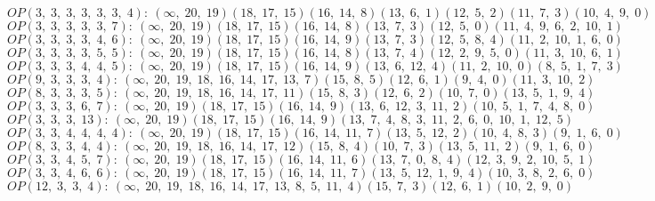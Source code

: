 $OP(3, \;3, \;3, \;3, \;3, \;3, \;4): \:(\infty, \;20, \;19)(18, \;17, \;15)(16, \;14, \;8)(13, \;6, \;1)(12, \;5, \;2)(11, \;7, \;3)(10, \;4, \;9, \;0)$\\
$OP(3, \;3, \;3, \;3, \;3, \;7): \:(\infty, \;20, \;19)(18, \;17, \;15)(16, \;14, \;8)(13, \;7, \;3)(12, \;5, \;0)(11, \;4, \;9, \;6, \;2, \;10, \;1)$\\
$OP(3, \;3, \;3, \;3, \;4, \;6): \:(\infty, \;20, \;19)(18, \;17, \;15)(16, \;14, \;9)(13, \;7, \;3)(12, \;5, \;8, \;4)(11, \;2, \;10, \;1, \;6, \;0)$\\
$OP(3, \;3, \;3, \;3, \;5, \;5): \:(\infty, \;20, \;19)(18, \;17, \;15)(16, \;14, \;8)(13, \;7, \;4)(12, \;2, \;9, \;5, \;0)(11, \;3, \;10, \;6, \;1)$\\
$OP(3, \;3, \;3, \;4, \;4, \;5): \:(\infty, \;20, \;19)(18, \;17, \;15)(16, \;14, \;9)(13, \;6, \;12, \;4)(11, \;2, \;10, \;0)(8, \;5, \;1, \;7, \;3)$\\
$OP(9, \;3, \;3, \;3, \;4): \:(\infty, \;20, \;19, \;18, \;16, \;14, \;17, \;13, \;7)(15, \;8, \;5)(12, \;6, \;1)(9, \;4, \;0)(11, \;3, \;10, \;2)$\\
$OP(8, \;3, \;3, \;3, \;5): \:(\infty, \;20, \;19, \;18, \;16, \;14, \;17, \;11)(15, \;8, \;3)(12, \;6, \;2)(10, \;7, \;0)(13, \;5, \;1, \;9, \;4)$\\
$OP(3, \;3, \;3, \;6, \;7): \:(\infty, \;20, \;19)(18, \;17, \;15)(16, \;14, \;9)(13, \;6, \;12, \;3, \;11, \;2)(10, \;5, \;1, \;7, \;4, \;8, \;0)$\\
$OP(3, \;3, \;3, \;13): \:(\infty, \;20, \;19)(18, \;17, \;15)(16, \;14, \;9)(13, \;7, \;4, \;8, \;3, \;11, \;2, \;6, \;0, \;10, \;1, \;12, \;5)$\\
$OP(3, \;3, \;4, \;4, \;4, \;4): \:(\infty, \;20, \;19)(18, \;17, \;15)(16, \;14, \;11, \;7)(13, \;5, \;12, \;2)(10, \;4, \;8, \;3)(9, \;1, \;6, \;0)$\\
$OP(8, \;3, \;3, \;4, \;4): \:(\infty, \;20, \;19, \;18, \;16, \;14, \;17, \;12)(15, \;8, \;4)(10, \;7, \;3)(13, \;5, \;11, \;2)(9, \;1, \;6, \;0)$\\
$OP(3, \;3, \;4, \;5, \;7): \:(\infty, \;20, \;19)(18, \;17, \;15)(16, \;14, \;11, \;6)(13, \;7, \;0, \;8, \;4)(12, \;3, \;9, \;2, \;10, \;5, \;1)$\\
$OP(3, \;3, \;4, \;6, \;6): \:(\infty, \;20, \;19)(18, \;17, \;15)(16, \;14, \;11, \;7)(13, \;5, \;12, \;1, \;9, \;4)(10, \;3, \;8, \;2, \;6, \;0)$\\
$OP(12, \;3, \;3, \;4): \:(\infty, \;20, \;19, \;18, \;16, \;14, \;17, \;13, \;8, \;5, \;11, \;4)(15, \;7, \;3)(12, \;6, \;1)(10, \;2, \;9, \;0)$\\
